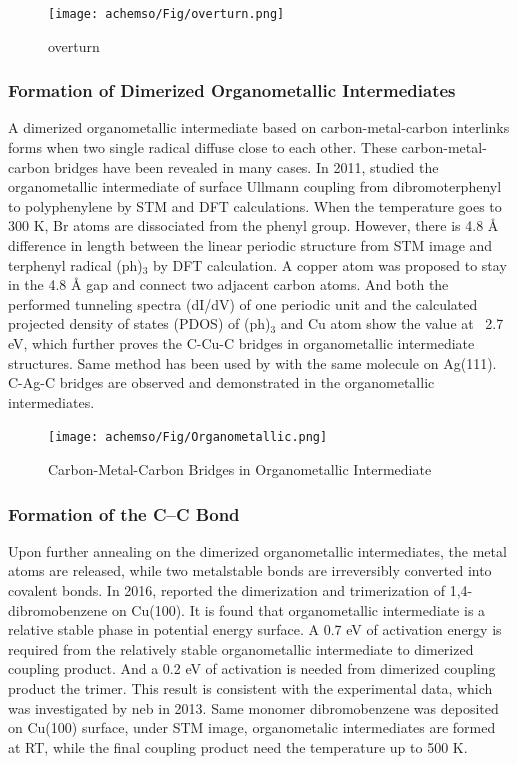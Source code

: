 \documentclass[journal=jacsat,manuscript=article]{achemso}
\begin{document}
\begin{figure}[ht]
\centering
\texttt{[image: achemso/Fig/overturn.png]}
\caption{overturn}
\label{fig:4}
\end{figure}


\subsubsection{Formation of Dimerized Organometallic Intermediates}
A dimerized organometallic intermediate based on carbon-metal-carbon interlinks forms when two single radical diffuse close to each other. These carbon-metal-carbon bridges have been revealed in many cases. In 2011, \citeauthor{jacs2011}\cite{jacs2011} studied the organometallic intermediate of surface Ullmann coupling from dibromoterphenyl to polyphenylene by STM and DFT calculations. When the temperature goes to 300 K, Br atoms are dissociated from the phenyl group. However, there is 4.8 \si{\angstrom} difference in length between the linear periodic structure from STM image and terphenyl radical (ph)$_{3}$ by DFT calculation. A copper atom was proposed to stay in the 4.8 \si{\angstrom} gap and connect two adjacent carbon atoms. And both the performed tunneling spectra (dI/dV) of one periodic unit and the calculated projected density of states (PDOS) of (ph)$_{3}$ and Cu atom show the value at ~2.7 eV, which further proves the C-Cu-C bridges in organometallic intermediate structures. Same method has been used by \citeauthor{PCCP2012}\cite{PCCP2012} with the same molecule on Ag(111). C-Ag-C bridges are observed and demonstrated in the organometallic intermediates.

\begin{figure}[ht]
\centering
\texttt{[image: achemso/Fig/Organometallic.png]}
\caption{Carbon-Metal-Carbon Bridges in Organometallic Intermediate}
\label{fig:organ}
\end{figure}


\subsubsection{Formation of the C--C Bond}
Upon further annealing on the dimerized organometallic intermediates, the metal atoms are released, while two metalstable bonds are irreversibly converted into covalent bonds. In 2016, \citeauthor{jacs2016}\cite{jacs2016} reported the dimerization and trimerization of 1,4-dibromobenzene on Cu(100). It is found that organometallic intermediate is a relative stable phase in potential energy surface. A 0.7 eV of activation energy is required from the relatively stable organometallic intermediate to dimerized coupling product. And a 0.2 eV of activation is needed from dimerized coupling product the trimer. This result is consistent with the experimental data, which was investigated by neb\citeauthor{acsnano2013} in 2013. Same monomer dibromobenzene was deposited on Cu(100) surface, under STM image, organometalic intermediates are formed at RT, while the final coupling product need the temperature up to 500 K.
\end{document}
